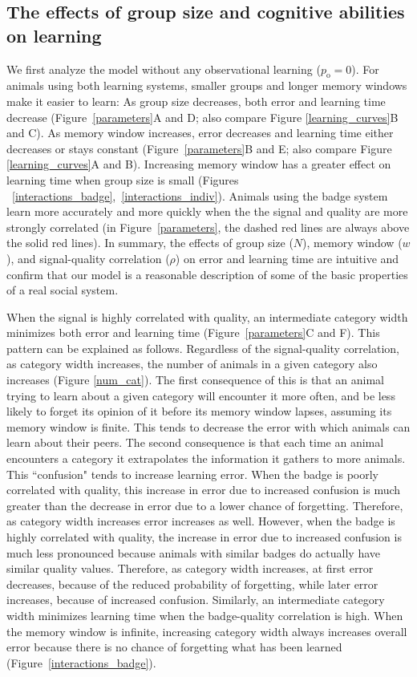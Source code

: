 \subsection*{The effects of group size and cognitive abilities on learning }
We first analyze the model without any observational learning ($p_\text{o}=0$).  
For animals using both learning systems, smaller groups and longer memory windows make it easier to learn: As group size decreases, both error and learning time decrease (Figure~\ref{parameters}A and D; also compare Figure \ref{learning_curves}B and C). As memory window increases, error decreases and learning time either decreases or stays constant (Figure~\ref{parameters}B and E; also compare Figure \ref{learning_curves}A and B). Increasing memory window has a greater effect on learning time when group size is small (Figures ~\ref{interactions_badge},~\ref{interactions_indiv}). Animals using the badge system learn more accurately and more quickly when the the signal and quality are more strongly correlated (in Figure~\ref{parameters}, the dashed red lines are always above the solid red lines). In summary, the effects of group size ($N$), memory window ($w$), and signal-quality correlation ($\rho$) on error and learning time are intuitive and confirm that our model is a reasonable description of some of the basic properties of a real social system. 
 
When the signal is highly correlated with quality, an intermediate category width minimizes both error and learning time (Figure~\ref{parameters}C and F). This pattern can be explained as follows. Regardless of the signal-quality correlation, as category width increases, the number of animals in a given category also increases (Figure \ref{num_cat}). The first consequence of this is that an animal trying to learn about a given category will encounter it more often, and be less likely to forget its opinion of it before its memory window lapses, assuming its memory window is finite. This tends to decrease the error with which animals can learn about their peers. The second consequence is that each time an animal encounters a category it extrapolates the information it gathers to more animals. This ``confusion" tends to increase learning error. When the badge is poorly correlated with quality, this increase in error due to increased confusion is much greater than the decrease in error due to a lower chance of forgetting. Therefore, as category width increases error increases as well. However, when the badge is highly correlated with quality, the increase in error due to increased confusion is much less pronounced because animals with similar badges do actually have similar quality values. Therefore, as category width increases, at first error decreases, because of the reduced probability of forgetting, while later error increases, because of increased confusion. Similarly, an intermediate category width minimizes learning time when the badge-quality correlation is high. When the memory window is infinite, increasing category width always increases overall error because there is no chance of forgetting what has been learned (Figure~\ref{interactions_badge}).



